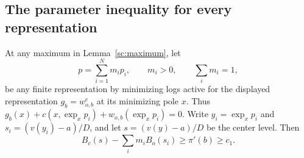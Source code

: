 \subsection{The parameter inequality for every representation}

\begin{lemma}\label{sc:parameter}
At any maximum in Lemma~\ref{sc:maximum}, let
\[
 p=\sum_{i=1}^N m_i p_i,\qquad m_i>0,\qquad\sum_i m_i=1,
\]
be any finite representation by minimizing logs active for the displayed
representation $g_b=w_{o,b}^c$ at its minimizing pole $x$.
Thus $g_b(x)+c(x,\exp_xp_i)+w_{o,b}(\exp_xp_i)=0$.
Write $y_i=\exp_xp_i$ and
$s_i=(v(y_i)-a)/D$, and let $s=(v(y)-a)/D$ be the center level.
Then
\begin{equation}
 B_c(s)-\sum_i m_iB_o(s_i)\geq \pi'(b)\geq c_1.
 \label{sc:parameter-inequality}
\end{equation}
\end{lemma}

